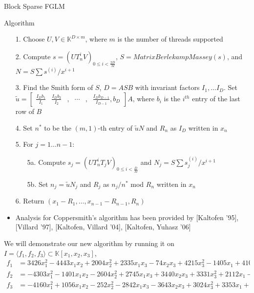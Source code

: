 \documentclass[final]{beamer}
\newlength{\twocolwid}
\begin{document}
\begin{frame}[t]
\begin{columns}[t]
\begin{column}{\twocolwid}
\begin{block}{Block Sparse FGLM}
	\begin{alertblock}{Algorithm}
		\begin{itemize}
			\item[1.] Choose $U,V \in \mathbb{K}^{D \times m}$, where $m$ is the number of threads supported
			\item[2.] Compute $s = (UT_n^iV)_{0 \le i < \frac{2D}{M}}$, $S = MatrixBerlekampMassey(s)$,
			and $N = S\sum s^{(i)}/x^{i+1}$
			\item[3.] Find the Smith form of $S$, $D = ASB$ with invariant factors 
			$I_1,\dots I_D$. Set
			$\tilde{u} = \begin{bmatrix}
			\frac{I_Db_1}{I_1} & \frac{I_Db_2}{I_2}&,&\cdots&,&\frac{I_Db_{D-1}}{I_{D-1}},b_D
			\end{bmatrix} A$, where $b_i$ is the $i^{th}$ entry of the last row of $B$
			\item[4.] Set $n^*$ to be the $(m,1)$-th entry of $\tilde{u}N$ and $R_n$ as $I_D$
			written in $x_n$
			\item[5.] For $j = 1 \dots n-1$:
			\begin{itemize}
				\item[5a.] Compute $s_j = (UT_n^i T_j V)_{0 \le i <
				\frac{D}{M}}$ and 
				$N_j = S\sum s_j^{(i)}/x^{i+1}$
				\item[5b.] Set $n_j = \tilde{u}N_j$ and $R_j$ as $n_j/n^*$ mod $R_n$
				written in $x_n$
			\end{itemize}
			\item[6.] Return $(x_1-R_1, \dots, x_{n-1} - R_{n-1}, R_n)$
		\end{itemize}
	\end{alertblock}
	\begin{itemize}
	\item Analysis for Coppersmith's algorithm has been provided by
	[Kaltofen '95], [Villard '97], [Kaltofen, Villard '04], [Kaltofen, Yuhasz '06]
	\end{itemize}
	\begin{example}
		We will demonstrate our new algorithm by running it on
		$I = \langle f_1, f_2, f_3 \rangle \subset \mathbb{K}[x_1,x_2,x_3]$,
		\begin{align*}
		f_1 &= 3426x_1^2 - 4443x_1x_2 + 2004x_2^2 + 2335x_1x_3 - 74x_2x_3 + 4215x_3^2 - 1405x_1 + 4108x_2 - 1838x_3 - 2741\\
		f_2 &= -4303x_1^2 - 1401x_1x_2 - 2604x_2^2 + 2745x_1x_3 + 3440x_2x_3 + 3331x_3^2 + 2112x_1 - 271x_2 - 2272x_3 - 3090\\
		f_3 &= -4160x_1^2 + 1056x_1x_2 - 252x_2^2 - 2842x_1x_3 - 3643x_2x_3 + 3024x_3^2 + 3353x_1 + 3908x_2 - 426x_3 + 4197

\end{align*}
\end{example}
\end{block}
\end{column}
\end{columns}
\end{frame}
\end{document}
